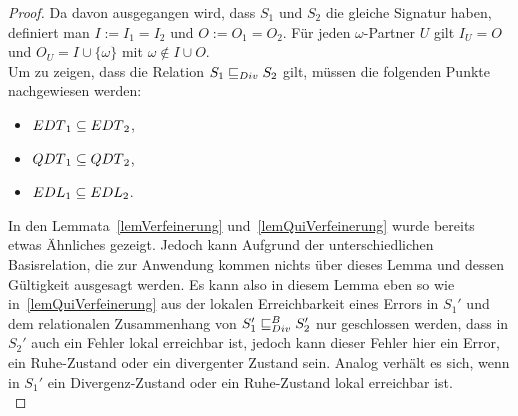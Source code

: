 \begin{proof}
  Da davon ausgegangen wird, dass $S_1$ und $S_2$ die gleiche Signatur haben,
  definiert man $I:=I_1=I_2$ und $O:=O_1=O_2$. Für jeden $\omega$-Partner $U$
  gilt $I_U=O$ und $O_U=I\cup\{\omega\}$ mit $\omega\notin I\cup O$.\\
  Um zu zeigen, dass die Relation $S_1\sqsubseteq _{Div} S_2$ gilt, müssen die folgenden
  Punkte nachgewiesen werden:
  \begin{itemize}
    \item $EDT{}_1\subseteq EDT{}_2$,
    \item $QDT{}_1\subseteq QDT{}_2$,
    \item $EDL{}_1\subseteq EDL{}_2$.
  \end{itemize}
  In den Lemmata~\ref{lemVerfeinerung} und~\ref{lemQuiVerfeinerung} wurde
  bereits etwas Ähnliches gezeigt. Jedoch kann Aufgrund der unterschiedlichen
  Basisrelation, die zur Anwendung kommen nichts über dieses Lemma und dessen
  Gültigkeit ausgesagt werden. Es kann also in diesem Lemma eben so wie
  in~\ref{lemQuiVerfeinerung} aus der lokalen Erreichbarkeit eines Errors in
  $S_1'$ und dem relationalen Zusammenhang von $S_1'\sqsubseteq _{Div}^B S_2'$ nur
  geschlossen werden, dass in $S_2'$ auch ein Fehler lokal erreichbar ist,
  jedoch kann dieser Fehler hier ein Error, ein Ruhe-Zustand oder ein
  divergenter Zustand sein. Analog verhält es sich, wenn in $S_1'$ ein
  Divergenz-Zustand oder ein Ruhe-Zustand lokal erreichbar ist.\\


\end{proof}
